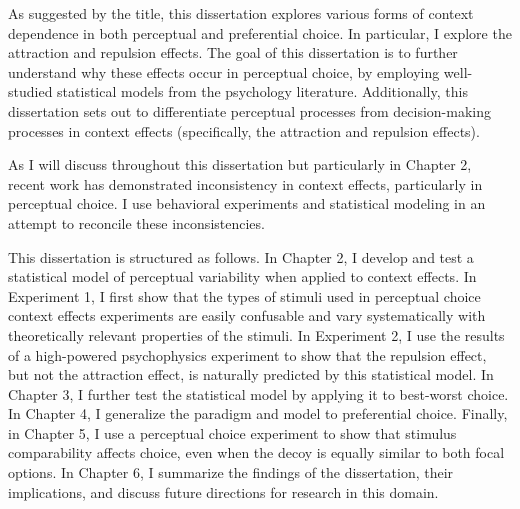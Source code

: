 As suggested by the title, this dissertation explores various forms of context dependence in both perceptual and preferential choice. In particular, I explore the attraction and repulsion effects. The goal of this dissertation is to further understand why these effects occur in perceptual choice, by employing well-studied statistical models from the psychology literature. Additionally, this dissertation sets out to differentiate perceptual processes from decision-making processes in context effects (specifically, the attraction and repulsion effects).

As I will discuss throughout this dissertation but particularly in Chapter 2, recent work has demonstrated inconsistency in context effects, particularly in perceptual choice. I use behavioral experiments and statistical modeling in an attempt to reconcile these inconsistencies.

This dissertation is structured as follows. In Chapter 2, I develop and test a statistical model of perceptual variability when applied to context effects. In Experiment 1, I first show that the types of stimuli used in perceptual choice context effects experiments are easily confusable and vary systematically with theoretically relevant properties of the stimuli. In Experiment 2, I use the results of a high-powered psychophysics experiment to show that the repulsion effect, but not the attraction effect, is naturally predicted by this statistical model. In Chapter 3, I further test the statistical model by applying it to best-worst choice. In Chapter 4, I generalize the paradigm and model to preferential choice. Finally, in Chapter 5, I use a perceptual choice experiment to show that stimulus comparability affects choice, even when the decoy is equally similar to both focal options. In Chapter 6, I summarize the findings of the dissertation, their implications, and discuss future directions for research in this domain. 

